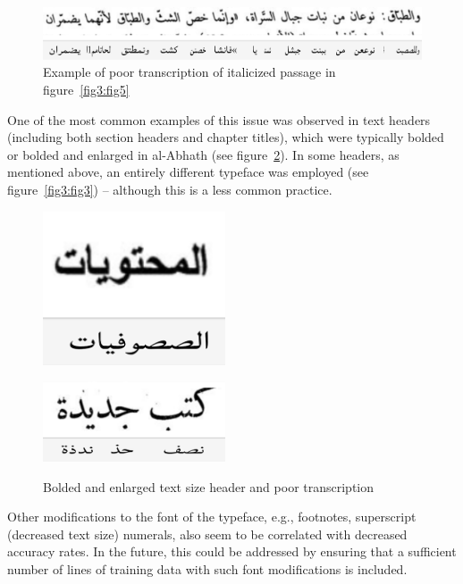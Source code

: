 \begin{figure}[h]
	\includegraphics[width=\linewidth]{images/image6.png}
	\caption{Example of poor transcription of italicized passage in figure~\ref{fig3:fig5}}
	\label{fig3:fig6}
\end{figure}

One of the most common examples of this issue was observed in text headers
(including both section headers and chapter titles), which were typically
bolded or bolded and enlarged in al-Abhath (see figure~\ref{fig3:fig7}). In some
headers, as mentioned above, an entirely different typeface was employed (see
figure~\ref{fig3:fig3}) -- although this is a less common practice.

\begin{figure}
	\centering
	\includegraphics[width=0.48\textwidth]{images/image5.png}
 
	\includegraphics[width=0.48\textwidth]{images/image7.png}
	\label{fig3:fig7}
	\caption{Bolded and enlarged text size header and poor transcription}
\end{figure}

Other modifications to the font of the typeface, e.g., footnotes, superscript
(decreased text size) numerals, also seem to be correlated with decreased
accuracy rates. In the future, this could be addressed by ensuring that a
sufficient number of lines of training data with such font modifications is
included.


